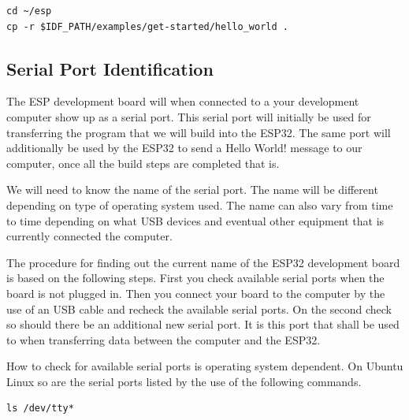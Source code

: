 \documentclass{tufte-book}
\begin{document}
\begin{lstlisting}
cd ~/esp
cp -r $IDF_PATH/examples/get-started/hello_world .
\end{lstlisting}

\subsection{Serial Port Identification} \label{sec:serial}


The ESP development board will when connected to a your development computer show up as a serial port. This serial port will initially be used for transferring the program that we will build into the ESP32. The same port will additionally be used by the ESP32 to send a Hello World! message to our computer, once all the build steps are completed that is.

We will need to know the name of the serial port. The name will be different depending on type of operating system used. The name can also vary from time to time depending on what USB devices and eventual other equipment that is currently connected the computer.

The procedure for finding out the current name of the ESP32 development board is based on the following steps. First you check available serial ports when the board is not plugged in. Then you connect your board to the computer by the use of an USB cable and recheck the available serial ports. On the second check so should there be an additional new serial port. It is this port that shall be used to when transferring data between the computer and the ESP32.

How to check for available serial ports is operating system dependent. On Ubuntu Linux so are the serial ports listed by the use of the following commands.

\begin{lstlisting}
ls /dev/tty*
\end{lstlisting}
\end{document}
